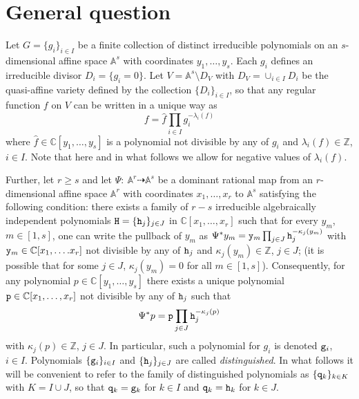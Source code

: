 \documentclass{amsart}
\theoremstyle{definition}
\theoremstyle{remark}
\numberwithin{equation}{section}
\numberwithin{theorem}{section}
\def\AA{{\mathbb A}}
\def\C{{\mathbb C}}
\def\Z{{\mathbb Z}}
\def\ttg{{\tt g}}
\def\tth{{\tt h}}
\def\ttp{{\tt p}}
\def\ttq{{\tt q}}
\def\tty{{\tt y}}
\def\ttH{{\tt H}}
\def\:{{:\ }}
\begin{document}
\section{General question} \label{prelim}

Let $G=\{g_i\}_{i\in I}$ be a finite collection of distinct irreducible polynomials on an $s$-dimensional affine space $\AA^s$ with coordinates $y_1,\dots,y_s$. Each $g_i$ defines an irreducible divisor $D_i=\{g_i=0\}$. Let $V=\AA^s\setminus D_V$ with $D_V=\cup_{i\in I}D_i$ be the quasi-affine variety defined by the collection $\{D_i\}_{i\in I}$, so that any
regular function $f$ on $V$ can be written in a unique way as 
\begin{equation}\label{regonV}
f=\hat f\prod_{i\in I}g_i^{-\lambda_i(f)}
\end{equation}
 where $\hat f\in\C[y_1,\dots,y_s]$ is a  polynomial not divisible by any of $g_i$ and $\lambda_i(f)\in\Z$, $i\in I$.
 Note that here and in what follows we allow for negative values of $\lambda_i(f)$.

Further, let $r\ge s$ and let $\Psi\:\AA^r\dashrightarrow\AA^s$ be a dominant rational map from an $r$-dimensional affine space $\AA^r$ with coordinates $x_1,\dots,x_r$ to $\AA^s$ satisfying the following condition: there exists a family of $r-s$ irreducible algebraically independent polynomials $\ttH=\{\tth_j\}_{j\in J}$ in $\C[x_1,\dots,x_r]$
such that for every $y_m$, $m\in[1,s]$, one can write the pullback of $y_m$ 
as $\Psi^*y_m=\tty_m\prod_{j\in J}\tth_j^{-\kappa_{j}(y_m)}$ with $\tty_m\in\C[x_1,\dots.x_r]$ not divisible by any of $\tth_j$ and $\kappa_{j}(y_m)\in\Z$, $j\in J$; (it is possible that for some $j\in J$, $\kappa_j(y_m)=0$ for all 
$m\in[1,s]$).
Consequently, for any polynomial $p\in\C[y_1,\dots,y_s]$ there exists a unique polynomial $\ttp\in\C[x_1,\dots,x_r]$ not divisible by any of $\tth_j$ such that
\begin{equation}\label{polypull}
\Psi^*p=\ttp\prod_{j\in J}\tth_j^{-\kappa_{j}(p)}
\end{equation}
 with $\kappa_{j}(p)\in\Z$, $j\in J$. 
In particular, such a polynomial for $g_i$ is denoted $\ttg_i$, $i\in I$.
Polynomials $\{\ttg_i\}_{i\in I}$ and $\{\tth_j\}_{j\in J}$ are called {\it distinguished}.
In what follows it will be convenient to refer to the family of distinguished polynomials as 
$\{\ttq_k\}_{k\in K}$ with $K=I\cup J$, so that $\ttq_k=\ttg_k$ for $k\in I$ and $\ttq_k=\tth_k$ for $k\in J$. 
\end{document}
